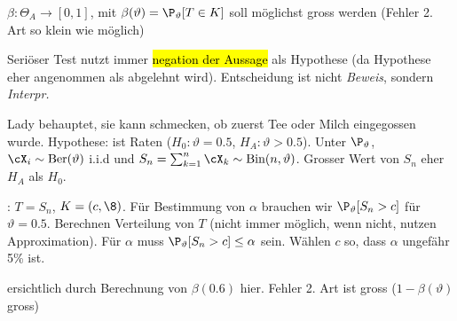 \shortdefinition[Macht] $\beta: \Theta_A \rightarrow [0, 1]$, mit $\beta(\vartheta) = \P_\vartheta[T \in K]$ soll möglichst gross werden (Fehler 2. Art so klein wie möglich)

\shortremark Seriöser Test nutzt immer \hl{negation der Aussage} als Hypothese (da Hypothese eher angenommen als abgelehnt wird).
Entscheidung ist nicht \textit{Beweis}, sondern \textit{Interpr.}

 Lady behauptet, sie kann schmecken, ob zuerst Tee oder Milch eingegossen wurde.
Hypothese: ist Raten ($H_0: \vartheta = 0.5$, $H_A: \vartheta > 0.5$). Unter $\P_\vartheta$, $\cX_i \sim \text{Ber}(\vartheta)$ i.i.d und
$S_n = \sum_{k = 1}^{n} \cX_k \sim \text{Bin}(n, \vartheta)$. Grosser Wert von $S_n$ eher $H_A$ als $H_0$. 

: $T = S_n$, $K = (c, \8)$. Für Bestimmung von $\alpha$ brauchen wir $\P_\vartheta[S_n > c]$ für $\vartheta = 0.5$.
Berechnen Verteilung von $T$ (nicht immer möglich, wenn nicht, nutzen Approximation). Für $\alpha$ muss $\P_\vartheta[S_n > c] \leq \alpha$ sein.
Wählen $c$ so, dass $\alpha$ ungefähr 5\% ist. 

 ersichtlich durch Berechnung von $\beta(0.6)$ hier. Fehler 2. Art ist gross ($1 - \beta(\vartheta)$ gross)
